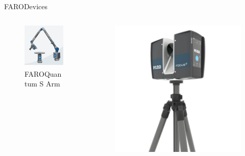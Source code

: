 \documentclass[10pt]{beamer}
\newcommand{\faro}[0]{FARO\textsuperscript{\textregistered}\space}
\begin{document}
  \begin{frame}{\faro Devices}
    \begin{columns}
      \begin{column}{0.30\textwidth}
        \begin{figure}
          \centering
          \includegraphics[width=\textwidth]{images/faro_quantum_s_arm.png}
          \caption{\newline\faro Quantum S \newline Arm}
        \end{figure}
      \end{column}
      \begin{column}{0.30\textwidth}
        \begin{figure}
          \centering
          \includegraphics[width=\textwidth]{images/faro_scanner.jpg}

\end{figure}
\end{column}
\end{columns}
\end{frame}
\end{document}
